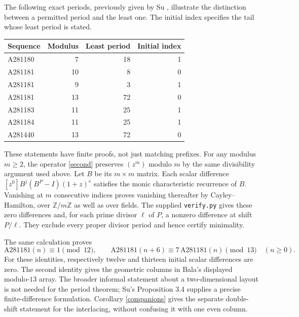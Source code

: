 \documentclass[11pt]{article}
\newcommand{\ZZ}{\mathbb Z}
\begin{document}
The following exact periods, previously given by Su
\cite[Proposition 3.6]{su}, illustrate the distinction between a
permitted period and the least one. The initial index specifies the
tail whose least period is stated.
\begin{center}
\begin{tabular}{lrrr}
\toprule
Sequence & Modulus & Least period & Initial index\\
\midrule
A281180 & 7 & 18 & 1\\
A281181 & 10 & 8 & 0\\
A281181 & 9 & 3 & 1\\
A281181 & 13 & 72 & 0\\
A281183 & 11 & 25 & 1\\
A281184 & 11 & 25 & 1\\
A281440 & 13 & 72 & 0\\
\bottomrule
\end{tabular}
\end{center}
These statements have finite proofs, not just matching prefixes.
For any modulus $m\geq2$, the operator \eqref{second} preserves
$(z^m)$ modulo $m$ by the same divisibility argument used above.
Let $B$ be its $m\times m$ matrix. Each scalar difference
$[z^0]B^j(B^P-I)(1+z)^e$ satisfies the monic characteristic
recurrence of $B$. Vanishing at $m$ consecutive indices proves
vanishing thereafter by Cayley--Hamilton, over $\ZZ/m\ZZ$ as well
as over fields. The supplied \texttt{verify.py} gives these zero
differences and, for each prime divisor $\ell$ of $P$, a nonzero
difference at shift $P/\ell$. They exclude every proper divisor
period and hence certify minimality.

The same calculation proves
\[
 \mathrm{A281181}(n)\equiv1\pmod{12},\qquad
 \mathrm{A281181}(n+6)\equiv7\,\mathrm{A281181}(n)\pmod{13}
 \quad(n\geq0).
\]
For these identities, respectively twelve and thirteen initial scalar
differences are zero. The second identity gives the geometric columns
in Bala's displayed modulo-$13$ array. The broader informal statement
about a two-dimensional layout is not needed for the period theorem;
Su's Proposition 3.4 supplies a precise finite-difference formulation.
Corollary \ref{companions} gives the separate double-shift statement
for the interlacing, without confusing it with one even column.
\end{document}
